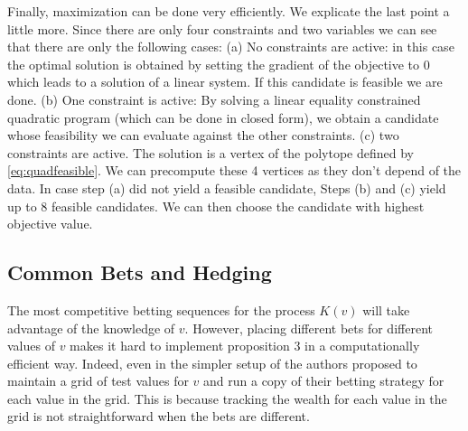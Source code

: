 Finally, maximization can be done very efficiently.
We explicate the last point a little more. Since there are only four 
constraints and two variables we can see that there are only the 
following cases: (a) No constraints are active: in this case 
the optimal solution is obtained by setting the gradient of the 
objective to 0 which leads to a solution of a linear system.
If this candidate is feasible we are done.
(b) One constraint is active: By solving
a linear equality constrained quadratic program (which can be done
in closed form), we obtain a candidate whose feasibility we 
can evaluate against the other constraints.
(c) two constraints are active. The solution is a vertex of the
polytope defined by \eqref{eq:quadfeasible}. We can precompute
these 4 vertices as they don't depend of the data. In case 
step (a) did not yield a feasible candidate, Steps (b) and
(c) yield up to 8 feasible candidates. We can then choose 
the candidate with highest objective value.

\subsection{Common Bets and Hedging}
The most competitive betting sequences for the process
$K(v)$ will take advantage 
of the knowledge of $v$. However, placing different
bets for different values of $v$ makes it hard 
to implement proposition 3 in a computationally efficient 
way.
Indeed, even in the simpler setup of
\cite{waudby-smith_variance-adaptive_2020}
the authors proposed to maintain a grid of 
test values for $v$ and run a copy of their
betting strategy for each value in the grid.
This is because tracking the wealth for each
value in the grid is not straightforward when
the bets are different.  

